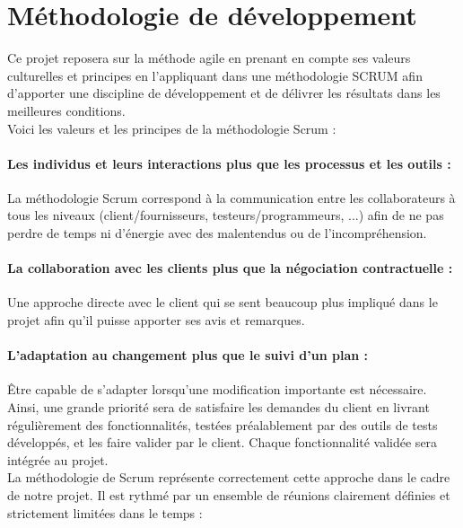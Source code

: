 \documentclass[a4paper,11pt,french]{article}
\begin{document}
\newpage

\section{Méthodologie de développement}

Ce projet reposera sur la méthode agile en prenant en compte ses valeurs culturelles et principes en l'appliquant dans une méthodologie SCRUM afin d'apporter une discipline de développement et de délivrer les résultats dans les meilleures conditions. \\

Voici les valeurs et les principes de la méthodologie Scrum : 
\paragraph{Les individus et leurs interactions plus que les processus et les outils :} 
La méthodologie Scrum correspond à la communication entre les collaborateurs à tous les niveaux (client/fournisseurs, testeurs/programmeurs, ...) afin de ne pas perdre de temps ni d'énergie avec des malentendus ou de l'incompréhension.

\paragraph{La collaboration avec les clients plus que la négociation contractuelle :}
Une approche directe avec le client qui se sent beaucoup plus impliqué dans le projet afin qu'il puisse apporter ses avis et remarques.

\paragraph{L’adaptation au changement plus que le suivi d’un plan :}
Être capable de s'adapter lorsqu'une modification importante est nécessaire.
\\

Ainsi, une grande priorité sera de satisfaire les demandes du client en livrant régulièrement des fonctionnalités, testées préalablement par des outils de tests développés, et les faire valider par le client. Chaque fonctionnalité validée sera intégrée au projet.\\

La méthodologie de Scrum représente correctement cette approche dans le cadre de notre projet. Il est rythmé par un ensemble de réunions clairement définies et strictement limitées dans le temps :\\
\end{document}
